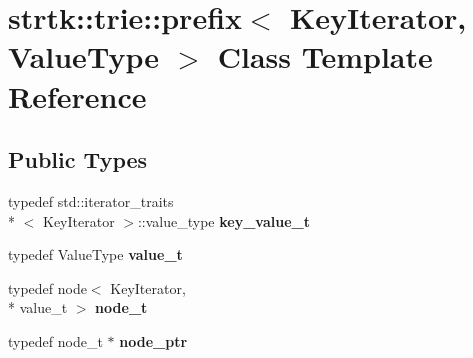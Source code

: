 \hypertarget{classstrtk_1_1trie_1_1prefix}{\section{strtk\-:\-:trie\-:\-:prefix$<$ Key\-Iterator, Value\-Type $>$ Class Template Reference}
\label{classstrtk_1_1trie_1_1prefix}
}
\subsection*{Public Types}
\begin{DoxyCompactItemize}
\item 
\hypertarget{classstrtk_1_1trie_1_1prefix_a23ef899d485148d2cee823d51730c4a6}{typedef std\-::iterator\-\_\-traits\\*
$<$ Key\-Iterator $>$\-::value\-\_\-type {\bfseries key\-\_\-value\-\_\-t}}\label{classstrtk_1_1trie_1_1prefix_a23ef899d485148d2cee823d51730c4a6}

\item 
\hypertarget{classstrtk_1_1trie_1_1prefix_a3b878f89a888e4ef4f853c20101155b9}{typedef Value\-Type {\bfseries value\-\_\-t}}\label{classstrtk_1_1trie_1_1prefix_a3b878f89a888e4ef4f853c20101155b9}

\item 
\hypertarget{classstrtk_1_1trie_1_1prefix_a240ea8030c5db8e1a843623a6860dd73}{typedef node$<$ Key\-Iterator, \\*
value\-\_\-t $>$ {\bfseries node\-\_\-t}}\label{classstrtk_1_1trie_1_1prefix_a240ea8030c5db8e1a843623a6860dd73}

\item 
\hypertarget{classstrtk_1_1trie_1_1prefix_a3bdf863ed8141cd866ddebc3b20c142d}{typedef node\-\_\-t $\ast$ {\bfseries node\-\_\-ptr}}\label{classstrtk_1_1trie_1_1prefix_a3bdf863ed8141cd866ddebc3b20c142d}

\end{DoxyCompactItemize}
